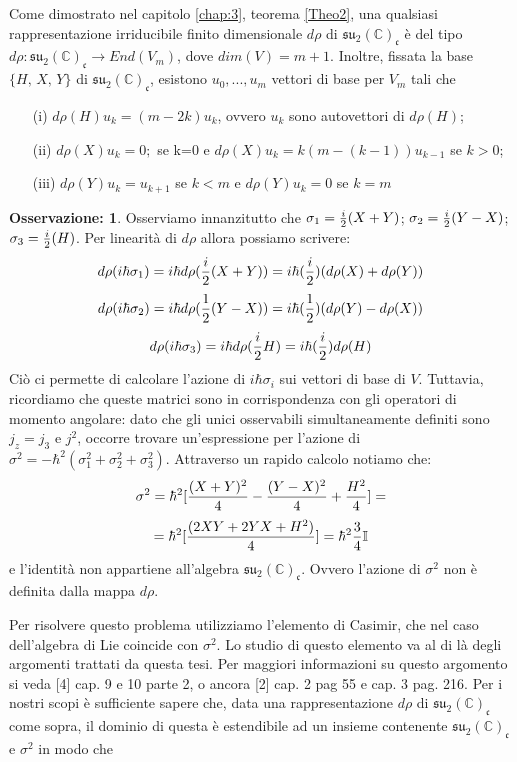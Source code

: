 \documentclass[12pt,a4paper]{report}
\theoremstyle{definition}
\theoremstyle{Theorem}
\theoremstyle{definition}
\theoremstyle{definition}
\theoremstyle{definition}
\newtheorem{Obs}[Def]{Osservazione:}
\begin{document}
Come dimostrato nel capitolo \ref{chap:3}, teorema \ref{Theo2}, una qualsiasi rappresentazione irriducibile finito dimensionale $d\rho$ di $\mathfrak{su_2(\mathbb{C})_c}$ è del tipo $d\rho: \mathfrak{su_2(\mathbb{C})_c}\rightarrow End(V_m)$, dove $dim(V)=m+1$. Inoltre, fissata la base $\{H,\, X,\, Y\}$ di $\mathfrak{su_2(\mathbb{C})_c}$, esistono $u_0,...,u_m$ vettori di base per $V_m$ tali che
\begin{itemize}
	\item[(i)] $d\rho(H)u_k=(m-2k)u_k$, ovvero $u_k$ sono autovettori di $d\rho(H)$;
	\item[(ii)] $d\rho(X)u_k=0;$ se k=0 e $d\rho(X)u_k=k(m-(k-1))u_{k-1}$ se $k>0$;
	\item[(iii)] $d\rho(Y)u_k=u_{k+1}$ se $k<m$ e $d\rho(Y)u_k=0$ se $k=m$
\end{itemize}
\begin{Obs}
	Osserviamo innanzitutto che $\sigma_1={i\over 2}(X+Y)$; $\sigma_2={i\over 2}(Y-X)$; $\sigma_3={i\over 2}(H)$. Per linearità di $d\rho$ allora possiamo scrivere: $$d\rho(i\hbar\sigma_1)=i\hbar d\rho({i\over 2}(X+Y))=i\hbar({i\over2})(d\rho(X)+d\rho(Y))$$
	$$d\rho(i\hbar\sigma_2)=i\hbar d\rho({1\over 2}(Y-X))=i\hbar({1\over2})(d\rho(Y)-d\rho(X))$$
	$$d\rho(i\hbar\sigma_3)=i\hbar d\rho({i\over 2}H)=i\hbar({i\over2})d\rho(H)$$
	Ciò ci permette di calcolare l'azione di $i\hbar\sigma_i$ sui vettori di base di $V$. Tuttavia, ricordiamo che queste matrici sono in corrispondenza con gli operatori di momento angolare: dato che gli unici osservabili simultaneamente definiti sono $j_z=j_3$ e $j^2$, occorre trovare un'espressione per l'azione di $\sigma^2=-\hbar^2(\sigma_1^2+\sigma_2^2+\sigma_3^2)$. Attraverso un rapido calcolo notiamo che:
	$$\sigma^2=\hbar^2[{(X+Y)^2\over 4}-{(Y-X)^2\over 4}+{H^2\over 4}]=$$
	$$=\hbar^2[{(2XY+2YX+H^2)\over 4}]=\hbar^2{3\over 4}\mathbb{I}$$
	e l'identità non appartiene all'algebra $\mathfrak{su_2(\mathbb{C})_c}$. Ovvero l'azione di $\sigma^2$ non è definita dalla mappa $d\rho$. 
\end{Obs}
Per risolvere questo problema utilizziamo l'elemento di Casimir, che nel caso dell'algebra di Lie coincide con $\sigma^2$. Lo studio di questo elemento va al di là degli argomenti trattati da questa tesi. Per maggiori informazioni su questo argomento si veda [4] cap. 9 e 10 parte 2, o ancora [2] cap. 2 pag 55 e cap. 3 pag. 216. Per i nostri scopi è sufficiente sapere che, data una rappresentazione $d\rho$ di $\mathfrak{su_2(\mathbb{C})_c}$ come sopra, il dominio di questa è estendibile ad un insieme contenente $\mathfrak{su_2(\mathbb{C})_c}$ e $\sigma^2$ in modo che
\end{document}
